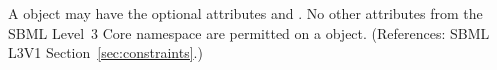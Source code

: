 A \Constraint object may have the optional attributes  and
.  No other attributes from the SBML Level~3 Core namespace
are permitted on a \Constraint object.  (References: SBML L3V1
Section~\ref{sec:constraints}.)
